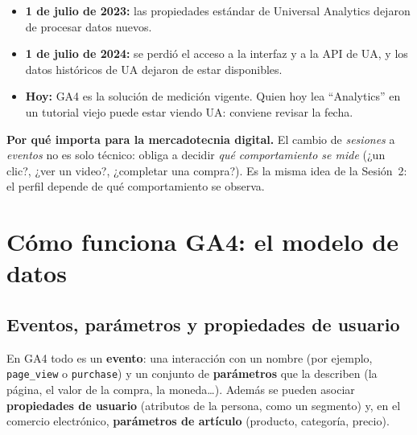 \documentclass[11pt,letterpaper]{article}
\begin{document}
\begin{cajaNota}[title={Cronología de la transición (fuente: ayuda oficial de Google)}]
\begin{itemize}[nosep]
  \item \textbf{1 de julio de 2023:} las propiedades estándar de Universal Analytics dejaron de procesar datos nuevos.
  \item \textbf{1 de julio de 2024:} se perdió el acceso a la interfaz y a la API de UA, y los datos históricos de UA dejaron de estar disponibles.
  \item \textbf{Hoy:} GA4 es la solución de medición vigente. Quien hoy lea \enquote{Analytics} en un tutorial viejo puede estar viendo UA: conviene revisar la fecha.
\end{itemize}
\end{cajaNota}

\textbf{Por qué importa para la mercadotecnia digital.} El cambio de \emph{sesiones} a \emph{eventos} no es solo técnico: obliga a decidir \emph{qué comportamiento se mide}
(¿un clic?, ¿ver un video?, ¿completar una compra?). Es la misma idea de la Sesión~2: el perfil depende de qué comportamiento se observa.

\section{Cómo funciona GA4: el modelo de datos}
\label{sec:modelo}

\subsection{Eventos, parámetros y propiedades de usuario}

En GA4 todo es un \textbf{evento}: una interacción con un nombre (por ejemplo, \texttt{page\_view} o \texttt{purchase}) y un conjunto de \textbf{parámetros} que la describen
(la página, el valor de la compra, la moneda\ldots). Además se pueden asociar \textbf{propiedades de usuario} (atributos de la persona, como un segmento) y, en el comercio
electrónico, \textbf{parámetros de artículo} (producto, categoría, precio).
\end{document}
